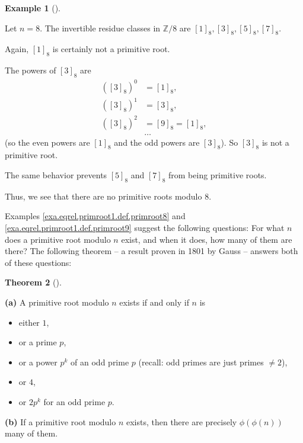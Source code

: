 \documentclass[numbers=enddot,12pt,final,onecolumn,notitlepage]{scrartcl}%
\numberwithin{exer}{subsection}
\theoremstyle{definition}
\newtheorem{theo}{Theorem}[subsection]
\newenvironment{theorem}[1][]
{\begin{theo}[#1]\begin{leftbar}}
{\end{leftbar}\end{theo}}
\newtheorem{exam}[theo]{Example}
\newenvironment{example}[1][]
{\begin{exam}[#1]\begin{leftbar}}
{\end{leftbar}\end{exam}}
\begin{document}
\begin{example}
\label{exa.eqrel.primroot1.def.primroot8}Let $n=8$. The invertible residue
classes in $\mathbb{Z}/8$ are $\left[  1\right]  _{8},\left[  3\right]
_{8},\left[  5\right]  _{8},\left[  7\right]  _{8}$.

Again, $\left[  1\right]  _{8}$ is certainly not a primitive root.

The powers of $\left[  3\right]  _{8}$ are
\begin{align*}
\left(  \left[  3\right]  _{8}\right)  ^{0}  &  =\left[  1\right]  _{8},\\
\left(  \left[  3\right]  _{8}\right)  ^{1}  &  =\left[  3\right]  _{8},\\
\left(  \left[  3\right]  _{8}\right)  ^{2}  &  =\left[  9\right]
_{8}=\left[  1\right]  _{8},\\
&  \ldots
\end{align*}
(so the even powers are $\left[  1\right]  _{8}$ and the odd powers are
$\left[  3\right]  _{8}$). So $\left[  3\right]  _{8}$ is not a primitive root.

The same behavior prevents $\left[  5\right]  _{8}$ and $\left[  7\right]
_{8}$ from being primitive roots.

Thus, we see that there are no primitive roots modulo $8$.
\end{example}

Examples \ref{exa.eqrel.primroot1.def.primroot8} and
\ref{exa.eqrel.primroot1.def.primroot9} suggest the following questions: For
what $n$ does a primitive root modulo $n$ exist, and when it does, how many of
them are there? The following theorem -- a result proven in 1801 by Gauss --
answers both of these questions:

\begin{theorem}
\label{thm.eqrel.primroot.gauss}\textbf{(a)} A primitive root modulo $n$
exists if and only if $n$ is

\begin{itemize}
\item either $1$,

\item or a prime $p$,

\item or a power $p^{k}$ of an odd prime $p$ (recall: odd primes are just
primes $\neq2$),

\item or $4$,

\item or $2p^{k}$ for an odd prime $p$.
\end{itemize}

\textbf{(b)} If a primitive root modulo $n$ exists, then there are precisely
$\phi\left(  \phi\left(  n\right)  \right)  $ many of them.
\end{theorem}
\end{document}
